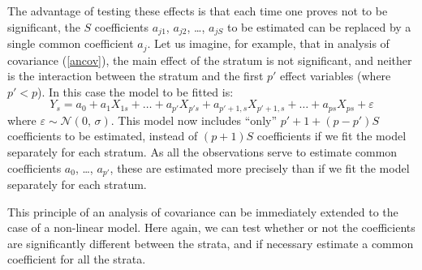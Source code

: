 The advantage of testing these effects is that each time one proves not to be significant, the $S$ coefficients $a_{j1}$, $a_{j2}$, \ldots, $a_{jS}$ to be estimated can be replaced by a single common coefficient $a_j$. Let us imagine, for example, that in analysis of covariance (\ref{ancov}), the main effect of the stratum is not significant, and neither is the interaction between the stratum and the first $p'$ effect variables (where $p'<p$). In this case the model to be fitted is:
\[
Y_s=a_0+a_1X_{1s}+\ldots+a_{p'}X_{p's}+a_{p'+1,s}X_{p'+1,s}+\ldots+a_{ps}X_{ps}+\varepsilon
\]
where $\varepsilon\sim\mathcal{N}(0,\,\sigma)$. This model now includes ``only'' $p'+1+(p-p')S$ coefficients to be estimated, instead of $(p+1)S$ coefficients if we fit the model separately for each stratum. As all the observations serve to estimate common coefficients $a_0$, \ldots, $a_{p'}$, these are estimated more precisely than if we fit the model separately for each stratum.

This principle of an analysis of covariance can be immediately extended to the case of a non-linear model. Here again, we can test whether or not the coefficients are significantly different between the strata, and if necessary estimate a common coefficient for all the strata.

